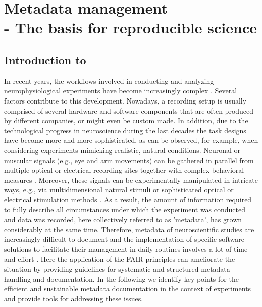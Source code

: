\cleardoublepage
\chapter[Metadata management]{Metadata management\\- The basis for reproducible science}
\label{sec:metadata}

\section{Introduction to }
\label{sec:Introduction}

In recent years, the workflows involved in conducting and analyzing neurophysiological experiments have become increasingly complex \citep[e.g.][]{Coles_2008, Denker_2016, Brochier_2018}. Several factors contribute to this development. Nowadays, a recording setup is usually comprised of several hardware and software components that are often produced by different companies, or might even be custom made. In addition, due to the technological progress in neuroscience during the last decades the task designs have become more and more sophisticated, as can be observed, for example, when considering experiments mimicking realistic, natural conditions. Neuronal or muscular signals (e.g., eye and arm movements) can be gathered in parallel from multiple optical or electrical recording sites \citep{Nicolelis_2002,Verkhratsky_2006,Obien_2014} together with complex behavioral measures \citep{Jacob_2010,Maldonado_2008,Vargas-Irwin_2010,Schwarz_2014}. Moreover, these signals can be experimentally manipulated in intricate ways, e.g., via multidimensional natural stimuli \citep{Geisler_2008} or sophisticated optical or electrical stimulation methods \citep{Deisseroth_2013,Miyamoto_2015}. As a result, the amount of information required to fully describe all circumstances under which the experiment was conducted and data was recorded, here collectively referred to as 'metadata', has grown considerably at the same time. Therefore, metadata of neuroscientific studies are increasingly difficult to document and the implementation of specific software solutions to facilitate their management in daily routines involves a lot of time and effort \citep{Zehl_2016}. Here the application of the FAIR principles can ameliorate the situation by providing guidelines for systematic and structured metadata handling and documentation. In the following we identify key points for the efficient and sustainable metadata documentation in the context of experiments and provide tools for addressing these issues.

